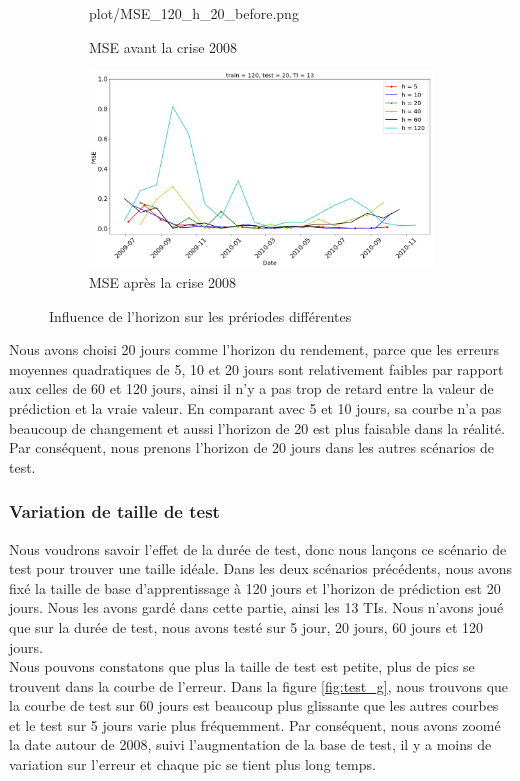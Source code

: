 \begin{figure}[H]
\begin{subfigure}{.5\textwidth}
	{plot/MSE_120_h_20_before.png}
	\caption{MSE avant la crise 2008}
	\label{fig:Horizon_before}
	\end{subfigure}%
	\begin{subfigure}{.5\textwidth}
	\centering
	\includegraphics[width=.9\linewidth, scale=0.2]
	{plot/MSE_120_h_20_after.png}
	\caption{MSE après la crise 2008}
	\label{fig:Horizon_after}
	\end{subfigure}
\caption{Influence de l'horizon sur les prériodes différentes}
\label{fig:MSE_horizon}
\end{figure}

Nous avons choisi 20 jours comme l'horizon du rendement, parce que les erreurs moyennes quadratiques de 5, 10 et 20 jours sont relativement faibles par rapport aux celles de 60 et 120 jours, ainsi il n'y a pas trop de retard entre la valeur de prédiction et la vraie valeur. En comparant avec 5 et 10 jours, sa courbe n'a pas beaucoup de changement et aussi l'horizon de 20 est plus faisable dans la réalité. Par conséquent, nous prenons l'horizon de 20 jours dans les autres scénarios de test.

\subsubsection{Variation de taille de test}

Nous voudrons savoir l'effet de la durée de test, donc nous lançons ce scénario de test pour trouver une taille idéale. Dans les deux scénarios précédents, nous avons fixé la taille de base d'apprentissage à 120 jours et l'horizon de prédiction est 20 jours. Nous les avons gardé dans cette partie, ainsi les 13 TIs. Nous n'avons joué que sur la durée de test, nous avons testé sur 5 jour, 20 jours, 60 jours et 120 jours. \\ 

Nous pouvons constatons que plus la taille de test est petite, plus de pics se trouvent dans la courbe de l'erreur. Dans la figure \ref{fig:test_g}, nous trouvons que la courbe de test sur 60 jours est beaucoup plus glissante que les autres courbes et le test sur 5 jours varie plus fréquemment. Par conséquent, nous avons zoomé la date autour de 2008, suivi l'augmentation de la base de test, il y a moins de variation sur l'erreur et chaque pic se tient plus long temps.  \\

